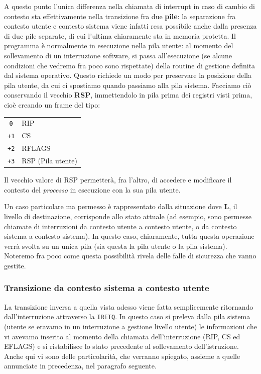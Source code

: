 \documentclass[a4paper,11pt]{article}
\begin{document}
A questo punto l'unica differenza nella chiamata di interrupt in caso di cambio di contesto sta effettivamente nella transizione fra due \textbf{pile}: la separazione fra contesto utente e contesto sistema viene infatti resa possibile anche dalla presenza di due pile separate, di cui l'ultima chiaramente sta in memoria protetta.
Il programma è normalmente in esecuzione nella pila utente: al momento del sollevamento di un interruzione software, si passa all'esecuzione (se alcune condizioni che vedremo fra poco sono rispettate) della routine di gestione definita dal sistema operativo.
Questo richiede un modo per preservare la posizione della pila utente, da cui ci spostiamo quando passiamo alla pila sistema.
Facciamo ciò conservando il vecchio \textbf{RSP}, immettendolo in pila prima dei registri visti prima, cioè creando un frame del tipo:
\begin{table}[H]
	\center
	\begin{tabular} { c | p{7cm} }
		\lstinline|0| & RIP \\
		\lstinline|+1| & CS \\
		\lstinline|+2| & RFLAGS \\ 
		\lstinline|+3| & RSP (Pila utente)
	\end{tabular}
\end{table}
Il vecchio valore di RSP permetterà, fra l'altro, di accedere e modificare il contesto del \textit{processo} in esecuzione con la sua pila utente.

Un caso particolare ma permesso è rappresentato dalla situazione dove \textbf{L}, il livello di destinazione, corrisponde allo stato attuale (ad esempio, sono permesse chiamate di interruzioni da contesto utente a contesto utente, o da contesto sistema a contesto sistema).
In questo caso, chiaramente, tutta questa operazione verrà svolta su un unica pila (sia questa la pila utente o la pila sistema).
Noteremo fra poco come questa possibilità rivela delle falle di sicurezza che vanno gestite.

\subsubsection{Transizione da contesto sistema a contesto utente}
La transizione inversa a quella vista adesso viene fatta semplicemente ritornando dall'interruzione attraverso la \lstinline|IRETQ|.
In questo caso si preleva dalla pila sistema (utente se eravamo in un interruzione a gestione livello utente) le informazioni che vi avevamo inserito al momento della chiamata dell'interruzione (RIP, CS ed EFLAGS) e si ristabilisce lo stato precedente al sollevamento dell'istruzione.
Anche qui vi sono delle particolarità, che verranno spiegato, assieme a quelle annunciate in precedenza, nel paragrafo seguente.
\end{document}
